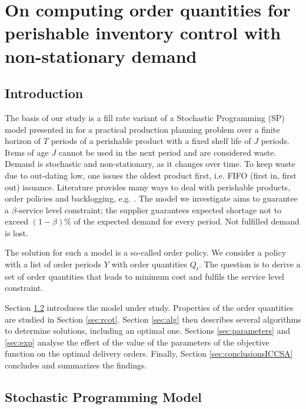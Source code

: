 \chapter{On computing order quantities for perishable inventory control with non-stationary demand} %
\label{Chap:iccsa2015}

\ifpdf
\graphicspath{{X/figures/PNG/}{X/figures/PDF/}{X/figures/}}
\else
\graphicspath{{X/figures/EPS/}{X/figures/}}
\fi

\section{Introduction}\label{sec:intro}
The basis of our study is a fill rate variant of a Stochastic Programming (SP) model presented in \cite{PAULS14} for a practical production planning problem over a finite horizon of $T$ periods of a perishable product with a fixed shelf life of $J$ periods. Items of age $J$ cannot be used in the next period and are considered waste. Demand is stochastic and non-stationary, as it changes over time. 
To keep waste due to out-dating low, one issues the oldest product first, i.e. FIFO  (first in, first out) issuance. Literature provides many ways to deal with perishable products, order policies and backlogging, e.g. \cite{hedjar2004,kurawarwala96,Silver98}. The model we investigate aims to guarantee a $\beta$-service level constraint; the supplier guarantees expected shortage not to exceed $(1-\beta)\%$ of the expected demand for every period. Not fulfilled demand is lost.

The solution for such a model is a so-called order policy.
We consider a policy with a list of order periods $Y$ with order quantities  $Q_t$. The question is to derive a set of order quantities that leads to minimum cost and fulfils the service level constraint.

Section \ref{sec:model} introduces the model under study. Properties of the order quantities are studied in Section \ref{sec:rcot}. Section \ref{sec:alg} then describes several algorithms to determine solutions, including an optimal one. Sections \ref{sec:parameters} and \ref{sec:exp} analyse the effect of the value of the parameters of the objective function on the optimal delivery orders. Finally, Section \ref{sec:conclusionsICCSA} concludes and summarizes the findings.



\section{Stochastic Programming Model}
\label{sec:model}

